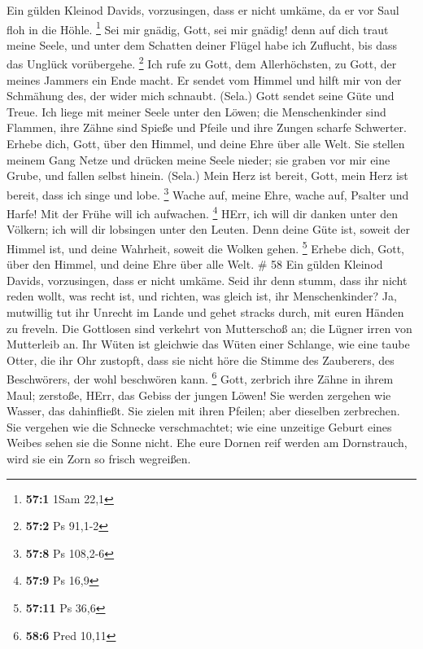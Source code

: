  Ein gülden Kleinod Davids, vorzusingen, dass er nicht
umkäme, da er vor Saul floh in die Höhle. \footnote{\textbf{57:1} 1Sam
  22,1}  Sei mir gnädig, Gott, sei mir gnädig! denn auf dich
traut meine Seele, und unter dem Schatten deiner Flügel habe ich
Zuflucht, bis dass das Unglück vorübergehe. \footnote{\textbf{57:2} Ps
  91,1-2}  Ich rufe zu Gott, dem Allerhöchsten, zu Gott, der
meines Jammers ein Ende macht.  Er sendet vom Himmel und
hilft mir von der Schmähung des, der wider mich schnaubt. (Sela.) Gott
sendet seine Güte und Treue.  Ich liege mit meiner Seele
unter den Löwen; die Menschenkinder sind Flammen, ihre Zähne sind Spieße
und Pfeile und ihre Zungen scharfe Schwerter.  Erhebe dich,
Gott, über den Himmel, und deine Ehre über alle Welt.  Sie
stellen meinem Gang Netze und drücken meine Seele nieder; sie graben vor
mir eine Grube, und fallen selbst hinein. (Sela.)  Mein Herz
ist bereit, Gott, mein Herz ist bereit, dass ich singe und lobe.
\footnote{\textbf{57:8} Ps 108,2-6}  Wache auf, meine Ehre,
wache auf, Psalter und Harfe! Mit der Frühe will ich aufwachen.
\footnote{\textbf{57:9} Ps 16,9}  HErr, ich will dir danken
unter den Völkern; ich will dir lobsingen unter den Leuten.
 Denn deine Güte ist, soweit der Himmel ist, und deine
Wahrheit, soweit die Wolken gehen. \footnote{\textbf{57:11} Ps 36,6}
 Erhebe dich, Gott, über den Himmel, und deine Ehre über
alle Welt. \# 58  Ein gülden Kleinod Davids, vorzusingen,
dass er nicht umkäme.  Seid ihr denn stumm, dass ihr nicht
reden wollt, was recht ist, und richten, was gleich ist, ihr
Menschenkinder?  Ja, mutwillig tut ihr Unrecht im Lande und
gehet stracks durch, mit euren Händen zu freveln.  Die
Gottlosen sind verkehrt von Mutterschoß an; die Lügner irren von
Mutterleib an.  Ihr Wüten ist gleichwie das Wüten einer
Schlange, wie eine taube Otter, die ihr Ohr zustopft,  dass
sie nicht höre die Stimme des Zauberers, des Beschwörers, der wohl
beschwören kann. \footnote{\textbf{58:6} Pred 10,11}  Gott,
zerbrich ihre Zähne in ihrem Maul; zerstoße, HErr, das Gebiss der jungen
Löwen!  Sie werden zergehen wie Wasser, das dahinfließt. Sie
zielen mit ihren Pfeilen; aber dieselben zerbrechen.  Sie
vergehen wie die Schnecke verschmachtet; wie eine unzeitige Geburt eines
Weibes sehen sie die Sonne nicht.  Ehe eure Dornen reif
werden am Dornstrauch, wird sie ein Zorn so frisch wegreißen.
